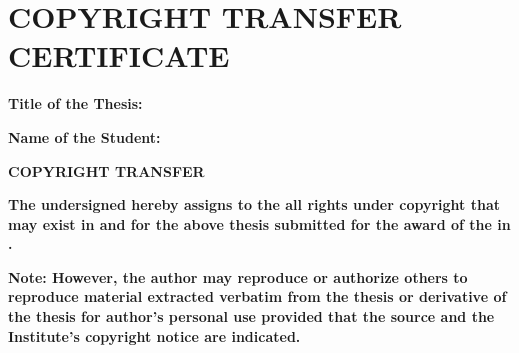 \chapter*{\centering\normalsize COPYRIGHT TRANSFER CERTIFICATE}

\textbf{Title of the Thesis:} \thetitle{}

\textbf{Name of the Student:} \theauthor{}

\vspace{1.5cm}

\textbf{\centering COPYRIGHT TRANSFER\\}

\vspace{1.5cm}

\textbf{The undersigned hereby assigns to the \institute{} all rights under copyright that may exist in and for the above thesis submitted for the award of the \degree{} in \program{}.}



\textbf{Note: However, the author may reproduce or authorize others to reproduce material extracted verbatim from the thesis or derivative of the thesis for author's personal use provided that the source and the Institute's copyright notice are indicated.}
